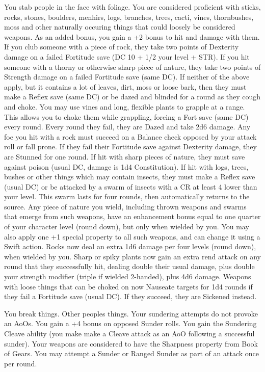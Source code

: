 \begin{multicols}{2}
\label{comm:feat:natureswarrior}{}
{You stab people in the face with foliage.
}{You are considered proficient with sticks, rocks, stones, boulders, menhirs, logs, branches, trees, cacti, vines, thornbushes, moss and other naturally occuring things that could loosely be considered weapons. As an added bonus, you gain a +2 bonus to hit and damage with them.
}{ If you club someone with a piece of rock, they take two points of Dexterity damage on a failed Fortitude save (DC 10 + 1/2 your level + STR). If you hit someone with a thorny or otherwise sharp piece of nature, they take two points of Strength damage on a failed Fortitude save (same DC). If neither of the above apply, but it contains a lot of leaves, dirt, moss or loose bark, then they must make a Reflex save (same DC) or be dazed and blinded for a round as they cough and choke. You may use vines and long, flexible plants to grapple at a range. This allows you to choke them while grappling, forcing a Fort save (same DC) every round. Every round they fail, they are Dazed and take 2d6 damage.
}{Any foe you hit with a rock must succeed on a Balance check opposed by your attack roll or fall prone. If they fail their Fortitude save against Dexterity damage, they are Stunned for one round. If hit with sharp pieces of nature, they must save against poison (usual DC, damage is 1d4 Constitution). If hit with logs, trees, bushes or other things which may contain insects, they must make a Reflex save (usual DC) or be attacked by a swarm of insects with a CR at least 4 lower than your level. This swarm lasts for four rounds, then automatically returns to the source.
}{Any piece of nature you wield, including thrown weapons and swarms that emerge from such weapons, have an enhancement bonus equal to one quarter of your character level (round down), but only when wielded by you. You may also apply one +1 special property to all such weapons, and can change it using a Swift action.
}{Rocks now deal an extra 1d6 damage per four levels (round down), when wielded by you. Sharp or spiky plants now gain an extra rend attack on any round that they successfully hit, dealing double their usual damage, plus double your strength modifier (triple if wielded 2-handed), plus 4d6 damage. Weapons with loose things that can be choked on now Nauseate targets for 1d4 rounds if they fail a Fortitude save (usual DC). If they succeed, they are Sickened instead.}

\label{comm:feat:sunderer}{}
{You break things. Other peoples things.
}{Your sundering attempts do not provoke an AoOs.
}{You gain a +4 bonus on opposed Sunder rolls.
}{You gain the Sundering Cleave ability (you make make a Cleave attack as an AoO following a successful sunder).
}{Your weapons are considered to have the Sharpness property from Book of Gears.
}{You may attempt a Sunder or Ranged Sunder as part of an attack once per round.}


\end{multicols}
